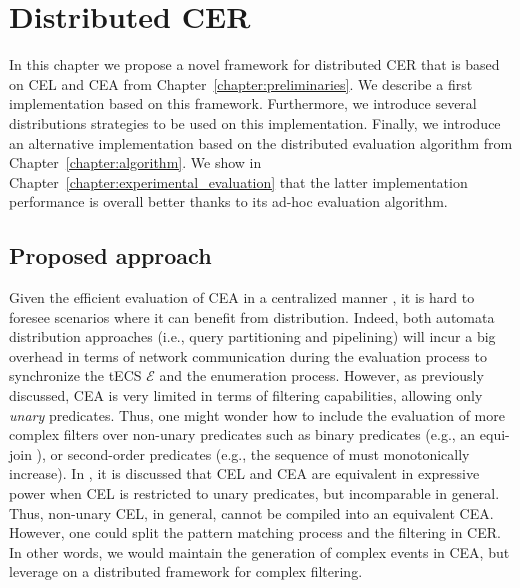 \chapter{Distributed CER}\label{chapter:distributed-cer}

In this chapter we propose a novel framework for distributed CER that is based on CEL and CEA from Chapter~\ref{chapter:preliminaries}. We describe a first implementation based on this framework. Furthermore, we introduce several distributions strategies to be used on this implementation. Finally, we introduce an alternative implementation based on the distributed evaluation algorithm from Chapter~\ref{chapter:algorithm}. We show in Chapter~\ref{chapter:experimental_evaluation} that the latter implementation performance is overall better thanks to its ad-hoc evaluation algorithm.

\section{Proposed approach}\label{sec:proposed-approach}

Given the efficient evaluation of CEA in a centralized manner \cite{formal-framework-cer, core}, it is hard to foresee scenarios where it can benefit from distribution. Indeed, both automata distribution approaches (i.e., query partitioning and pipelining) will incur a big overhead in terms of network communication during the evaluation process to synchronize the tECS $\mathcal{E}$ and the enumeration process. However, as previously discussed, CEA is very limited in terms of filtering capabilities, allowing only \emph{unary} predicates. Thus, one might wonder how to include the evaluation of more complex filters over non-unary predicates such as binary predicates (e.g., an equi-join ), or second-order predicates (e.g., the sequence of  must monotonically increase). In \cite{on-the-expressiveness}, it is discussed that CEL and CEA are equivalent in expressive power when CEL is restricted to unary predicates, but incomparable in general. Thus, non-unary CEL, in general, cannot be compiled into an equivalent CEA. However, one could split the pattern matching process and the filtering in CER. In other words, we would maintain the generation of complex events in CEA, but leverage on a distributed framework for complex filtering.

